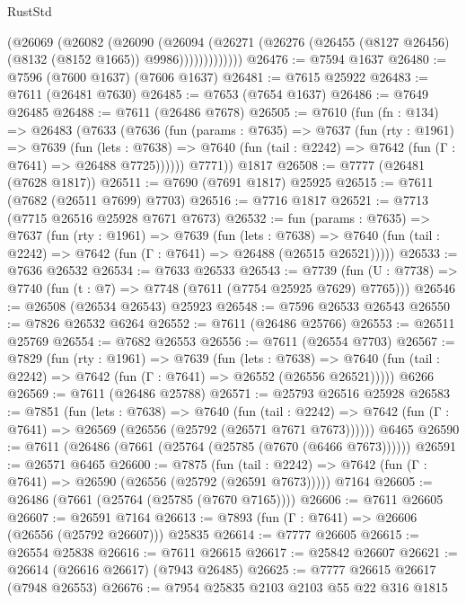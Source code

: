\begin{lexlean}{RustStd}
\begin{coremodule}
{\begin{coremodule}
{{{{{{{{{{{{{{{{{{{{{{{{{{{{{{{{{{                (@26069
                  (@26082
                    (@26090
                      (@26094
                        (@26271
                          (@26276 (@26455 (@8127 @26456) (@8132 (@8152 @1665)) @9986)))))))))))))
@26476 := @7594 @1637
@26480 := @7596 (@7600 @1637) (@7606 @1637)
@26481 := @7615 @25922
@26483 := @7611 (@26481 @7630)
@26485 := @7653 (@7654 @1637)
@26486 := @7649 @26485
@26488 := @7611 (@26486 @7678)
@26505 := @7610
    (fun (fn : @134) =>
    @26483
      (@7633
        (@7636
          (fun (params : @7635) =>
          @7637
            (fun (rty : @1961) =>
            @7639
              (fun (lets : @7638) =>
              @7640 (fun (tail : @2242) => @7642 (fun (Γ : @7641) => @26488 @7725))))))
        @7771))
    @1817
@26508 := @7777 (@26481 (@7628 @1817))
@26511 := @7690 (@7691 @1817) @25925
@26515 := @7611 (@7682 (@26511 @7699) @7703)
@26516 := @7716 @1817
@26521 := @7713 (@7715 @26516 @25928 @7671 @7673)
@26532 := fun (params : @7635) =>
  @7637
    (fun (rty : @1961) =>
    @7639
      (fun (lets : @7638) =>
      @7640 (fun (tail : @2242) => @7642 (fun (Γ : @7641) => @26488 (@26515 @26521)))))
@26533 := @7636 @26532
@26534 := @7633 @26533
@26543 := @7739
    (fun (U : @7738) => @7740 (fun (t : @7) => @7748 (@7611 (@7754 @25925 @7629) @7765)))
@26546 := @26508 (@26534 @26543) @25923
@26548 := @7596 @26533 @26543
@26550 := @7826 @26532 @6264
@26552 := @7611 (@26486 @25766)
@26553 := @26511 @25769
@26554 := @7682 @26553
@26556 := @7611 (@26554 @7703)
@26567 := @7829
    (fun (rty : @1961) =>
    @7639
      (fun (lets : @7638) =>
      @7640 (fun (tail : @2242) => @7642 (fun (Γ : @7641) => @26552 (@26556 @26521)))))
    @6266
@26569 := @7611 (@26486 @25788)
@26571 := @25793 @26516 @25928
@26583 := @7851
    (fun (lets : @7638) =>
    @7640
      (fun (tail : @2242) =>
      @7642 (fun (Γ : @7641) => @26569 (@26556 (@25792 (@26571 @7671 @7673))))))
    @6465
@26590 := @7611 (@26486 (@7661 (@25764 (@25785 (@7670 (@6466 @7673))))))
@26591 := @26571 @6465
@26600 := @7875
    (fun (tail : @2242) => @7642 (fun (Γ : @7641) => @26590 (@26556 (@25792 (@26591 @7673)))))
    @7164
@26605 := @26486 (@7661 (@25764 (@25785 (@7670 @7165))))
@26606 := @7611 @26605
@26607 := @26591 @7164
@26613 := @7893 (fun (Γ : @7641) => @26606 (@26556 (@25792 @26607))) @25835
@26614 := @7777 @26605
@26615 := @26554 @25838
@26616 := @7611 @26615
@26617 := @25842 @26607
@26621 := @26614 (@26616 @26617) (@7943 @26485)
@26625 := @7777 @26615 @26617 (@7948 @26553)
@26676 := @7954
    @25835
    @2103
    @2103
    @55
    @22
    @316
    @1815
}}}}}}}}}}}}}}}}}}}}}}}}}}}}}}}}}}
\end{coremodule}}
\end{coremodule}
\end{lexlean}
